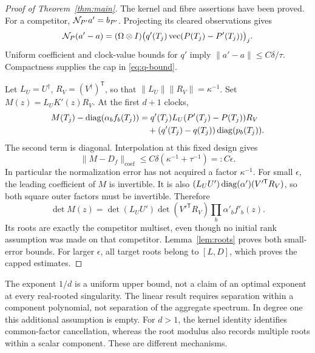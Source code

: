 \begin{proof}[Proof of Theorem~\ref{thm:main}]
The kernel and fibre assertions have been proved. For a competitor,
$\mathcal N_{P'}a'=b_{P'}$. Projecting its cleared observations gives
\begin{equation}\label{eq:normalization-difference}
 \mathcal N_P(a'-a)=(\Omega\otimes I)
       \big(q'(T_j)\operatorname{vec}(P(T_j)-P'(T_j))\big)_j.
\end{equation}
Uniform coefficient and clock-value bounds for $q'$ imply
$\|a'-a\|\le C\delta/\tau$. Compactness supplies the cap in
\eqref{eq:q-bound}.

Let $L_U=U^\dagger$, $R_V=(V^\dagger)^{\mathsf T}$, so that
$\|L_U\|\|R_V\|=\kappa^{-1}$. Set $M(z)=L_UK'(z)R_V$.
At the first $d+1$ clocks,
\begin{align}
 M(T_j)-\operatorname{diag}(\alpha_b f_b(T_j))
 &=q'(T_j)L_U(P'(T_j)-P(T_j))R_V\nonumber\\
 &\quad +(q'(T_j)-q(T_j))\operatorname{diag}(p_b(T_j)).
                                                        \label{eq:diagonal-error}
\end{align}
The second term is diagonal. Interpolation at this fixed design gives
\[
 \|M-D_f\|_{\mathrm{coef}}
              \le C\delta(\kappa^{-1}+\tau^{-1})=:C\epsilon.
\]
In particular the normalization error has not acquired a factor
$\kappa^{-1}$. For small $\epsilon$, the leading coefficient of $M$
is invertible. It is also
$(L_UU')\operatorname{diag}(\alpha')(V'^{\mathsf T}R_V)$, so both square outer
factors must be invertible. Therefore
\[
 \det M(z)=\det(L_UU')\det(V'^{\mathsf T}R_V)
                                  \prod_b\alpha'_b f'_b(z).
\]
Its roots are exactly the competitor multiset, even though no initial
rank assumption was made on that competitor. Lemma~\ref{lem:roots}
proves both small-error bounds. For larger $\epsilon$, all target
roots belong to $[L,D]$, which proves the capped estimates.
\end{proof}

\begin{remark}
The exponent $1/d$ is a uniform upper bound, not a claim of an optimal
exponent at every real-rooted singularity. The linear result requires
separation within a component polynomial, not separation of the
aggregate spectrum. In degree one this additional assumption is empty.
For $d>1$, the kernel identity identifies common-factor cancellation,
whereas the root modulus also records multiple roots within a scalar
component. These are different mechanisms.
\end{remark}
